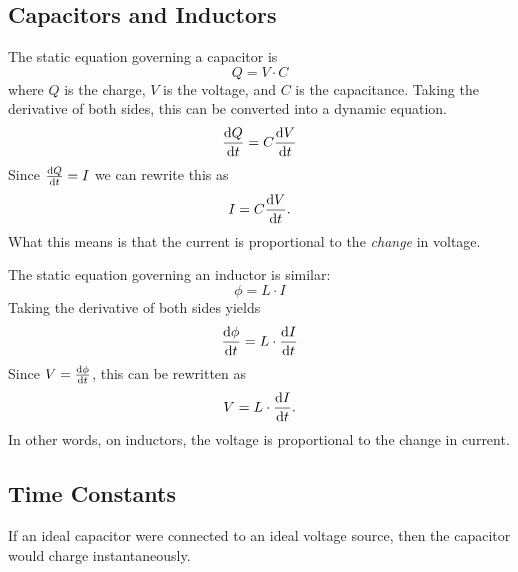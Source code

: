 \subsection{Capacitors and Inductors}

The static equation governing a capacitor is
\begin{equation}
Q = V \cdot C
\end{equation}
where $Q$ is the charge, $V$ is the voltage, and $C$ is the capacitance.
Taking the derivative of both sides, this can be converted into a dynamic equation. 
\begin{equation}
\frac{\mathrm{d}Q}{\mathrm{d}t} = C\frac{\mathrm{d}V}{\mathrm{d}t}
\end{equation}
Since $\frac{\mathrm{d}Q}{\mathrm{d}t} = I$ we can rewrite this as
\begin{equation}
I = C\frac{\mathrm{d}V}{\mathrm{d}t}.
\end{equation}
What this means is that the current is proportional to the \emph{change} in voltage.

The static equation governing an inductor is similar:
\begin{equation}
\phi = L \cdot I
\end{equation}
Taking the derivative of both sides yields
\begin{equation}
\frac{\mathrm{d}\phi}{\mathrm{d}t} = L \cdot \frac{\mathrm{d}I}{\mathrm{d}t}
\end{equation}
Since $V = \frac{\mathrm{d}\phi}{\mathrm{d}t}$, this can be rewritten as
\begin{equation}
V = L \cdot \frac{\mathrm{d}I}{\mathrm{d}t}.
\end{equation}
In other words, on inductors, the voltage is proportional to the change in current.

\subsection{Time Constants}

If an ideal capacitor were connected to an ideal voltage source, then the capacitor would charge instantaneously.

